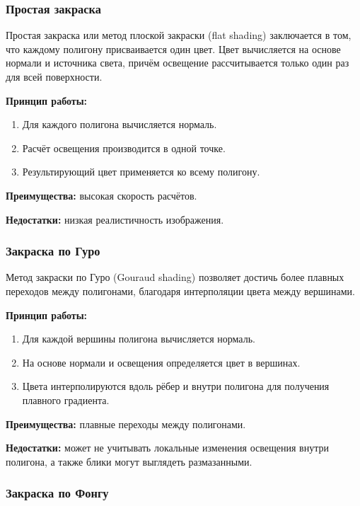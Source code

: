 \subsubsection{Простая закраска}

Простая закраска или метод плоской закраски (flat shading) заключается в том, что каждому полигону присваивается один цвет. Цвет вычисляется на основе нормали и источника света, причём освещение рассчитывается только один раз для всей поверхности.

\textbf{Принцип работы:}
\begin{enumerate}
    \item Для каждого полигона вычисляется нормаль.
    \item Расчёт освещения производится в одной точке.
    \item Результирующий цвет применяется ко всему полигону.
\end{enumerate}

\textbf{Преимущества:} высокая скорость расчётов.

\textbf{Недостатки:} низкая реалистичность изображения.

\subsubsection{Закраска по Гуро}

Метод закраски по Гуро (Gouraud shading) позволяет достичь более плавных переходов между полигонами, благодаря интерполяции цвета между вершинами.

\textbf{Принцип работы:}
\begin{enumerate}
    \item Для каждой вершины полигона вычисляется нормаль.
    \item На основе нормали и освещения определяется цвет в вершинах.
    \item Цвета интерполируются вдоль рёбер и внутри полигона для получения плавного градиента.
\end{enumerate}

\textbf{Преимущества:} плавные переходы между полигонами.

\textbf{Недостатки:} может не учитывать локальные изменения освещения внутри полигона, а также блики могут выглядеть размазанными.

\subsubsection{Закраска по Фонгу}

